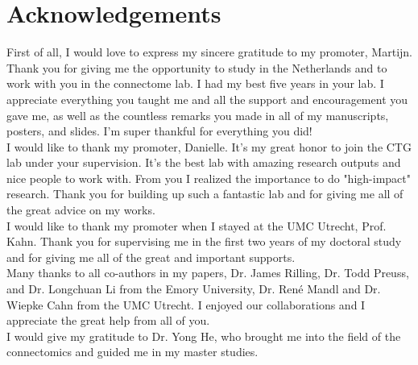 \pagestyle{backmatter}

\chapter{Acknowledgements}

First of all, I would love to express my sincere gratitude to my promoter, Martijn. Thank you for giving me the opportunity to study in the Netherlands and to work with you in the connectome lab. I had my best five years in your lab. I appreciate everything you taught me and all the support and encouragement you gave me, as well as the countless remarks you made in all of my manuscripts, posters, and slides. I'm super thankful for everything you did!\\

\noindent
I would like to thank my promoter, Danielle. It's my great honor to join the CTG lab under your supervision. It's the best lab with amazing research outputs and nice people to work with. From you I realized the importance to do "high-impact" research. Thank you for building up such a fantastic lab and for giving me all of the great advice on my works.\\

\noindent
I would like to thank my promoter when I stayed at the UMC Utrecht, Prof. Kahn. Thank you for supervising me in the first two years of my doctoral study and for giving me all of the great and important supports.\\

\noindent
Many thanks to all co-authors in my papers, Dr. James Rilling, Dr. Todd Preuss, and Dr. Longchuan Li from the Emory University, Dr. René Mandl and Dr. Wiepke Cahn from the UMC Utrecht. I enjoyed our collaborations and I appreciate the great help from all of you. \\

\noindent
I would give my gratitude to Dr. Yong He, who brought me into the field of the connectomics and guided me in my master studies. \\


